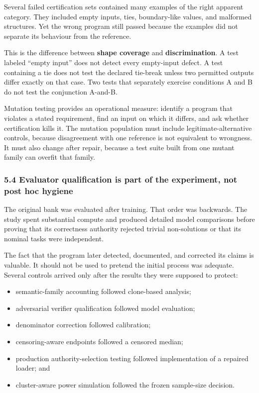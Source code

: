 \documentclass[
  9pt,
  letterpaper,
]{article}
\providecommand{\tightlist}{%
  \setlength{\itemsep}{0pt}\setlength{\parskip}{0pt}}
\begin{document}
Several failed certification sets contained many examples of the right
apparent category. They included empty inputs, ties, boundary-like
values, and malformed structures. Yet the wrong program still passed
because the examples did not separate its behaviour from the reference.

This is the difference between \textbf{shape coverage} and
\textbf{discrimination}. A test labeled ``empty input'' does not detect
every empty-input defect. A test containing a tie does not test the
declared tie-break unless two permitted outputs differ exactly on that
case. Two tests that separately exercise conditions A and B do not test
the conjunction A-and-B.

Mutation testing provides an operational measure: identify a program
that violates a stated requirement, find an input on which it differs,
and ask whether certification kills it. The mutation population must
include legitimate-alternative controls, because disagreement with one
reference is not equivalent to wrongness. It must also change after
repair, because a test suite built from one mutant family can overfit
that family.

\hypertarget{54-evaluator-qualification-is-part-of-the-experiment-not-post-hoc-hygiene}{%
\subsubsection{5.4 Evaluator qualification is part of the experiment,
not post hoc
hygiene}\label{54-evaluator-qualification-is-part-of-the-experiment-not-post-hoc-hygiene}}

The original bank was evaluated after training. That order was
backwards. The study spent substantial compute and produced detailed
model comparisons before proving that its correctness authority rejected
trivial non-solutions or that its nominal tasks were independent.

The fact that the program later detected, documented, and corrected its
claims is valuable. It should not be used to pretend the initial process
was adequate. Several controls arrived only after the results they were
supposed to protect:

\begin{itemize}
\tightlist
\item
  semantic-family accounting followed clone-based analysis;
\item
  adversarial verifier qualification followed model evaluation;
\item
  denominator correction followed calibration;
\item
  censoring-aware endpoints followed a censored median;
\item
  production authority-selection testing followed implementation of a
  repaired loader; and
\item
  cluster-aware power simulation followed the frozen sample-size
  decision.
\end{itemize}
\end{document}
